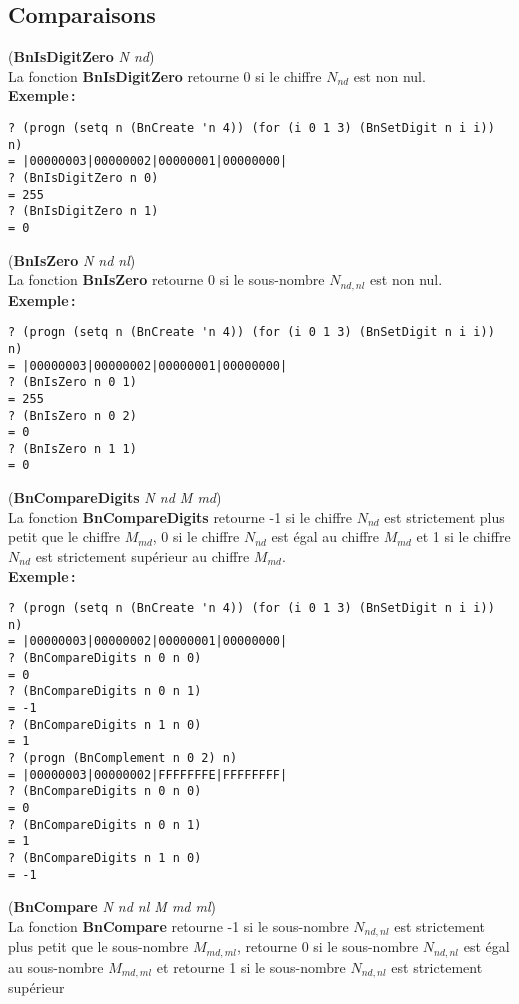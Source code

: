 \subsection{Comparaisons}
({\bf BnIsDigitZero} {\em N nd})
\\[12pt]
La fonction {\bf BnIsDigitZero} retourne 0 si le chiffre $N_{nd}$ est
non nul.
\\[18pt]
{\bf Exemple\,:}
\begin{verbatim}
? (progn (setq n (BnCreate 'n 4)) (for (i 0 1 3) (BnSetDigit n i i)) n)
= |00000003|00000002|00000001|00000000|
? (BnIsDigitZero n 0)
= 255
? (BnIsDigitZero n 1)
= 0
\end{verbatim}
\vspace*{24pt}
({\bf BnIsZero} {\em N nd nl})
\\[12pt]
La fonction {\bf BnIsZero} retourne 0 si le sous-nombre $N_{nd,nl}$ est
non nul.
\\[18pt]
{\bf Exemple\,:}
\begin{verbatim}
? (progn (setq n (BnCreate 'n 4)) (for (i 0 1 3) (BnSetDigit n i i)) n)
= |00000003|00000002|00000001|00000000|
? (BnIsZero n 0 1)
= 255
? (BnIsZero n 0 2)
= 0
? (BnIsZero n 1 1)
= 0
\end{verbatim}
\vspace*{24pt}
({\bf BnCompareDigits} {\em N nd M md})
\\[12pt]
La fonction {\bf BnCompareDigits} retourne -1 si le chiffre $N_{nd}$ est
strictement plus petit que le chiffre $M_{md}$, 0 si le chiffre
$N_{nd}$ est \'egal au chiffre $M_{md}$ et 1 si le chiffre $N_{nd}$
est strictement sup\'erieur au chiffre $M_{md}$.
\\[18pt]
{\bf Exemple\,:}
\begin{verbatim}
? (progn (setq n (BnCreate 'n 4)) (for (i 0 1 3) (BnSetDigit n i i)) n)
= |00000003|00000002|00000001|00000000|
? (BnCompareDigits n 0 n 0)
= 0
? (BnCompareDigits n 0 n 1)
= -1
? (BnCompareDigits n 1 n 0)
= 1
? (progn (BnComplement n 0 2) n)
= |00000003|00000002|FFFFFFFE|FFFFFFFF|
? (BnCompareDigits n 0 n 0)
= 0
? (BnCompareDigits n 0 n 1)
= 1
? (BnCompareDigits n 1 n 0)
= -1
\end{verbatim}
\vspace*{24pt}
({\bf BnCompare} {\em N nd nl M md ml})
\\[12pt]
La fonction {\bf BnCompare} retourne -1 si le sous-nombre $N_{nd,nl}$ est
strictement plus petit que le sous-nombre $M_{md,ml}$, retourne 0 si le
sous-nombre $N_{nd,nl}$ est \'egal au sous-nombre $M_{md,ml}$ et
retourne 1 si le sous-nombre $N_{nd,nl}$ est strictement sup\'erieur
